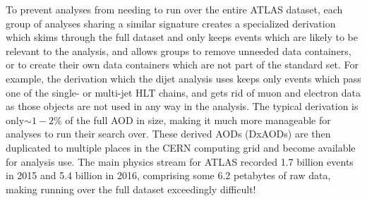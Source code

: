 To prevent analyses from needing to run over the entire ATLAS dataset, each group of analyses sharing a similar signature creates a specialized derivation which skims through the full dataset and only keeps events which are likely to be relevant to the analysis, and allows groups to remove unneeded data containers, or to create their own data containers which are not part of the standard set.  For example, the derivation which the dijet analysis uses keeps only events which pass one of the single- or multi-jet HLT chains, and gets rid of muon and electron data as those objects are not used in any way in the analysis.  The typical derivation is only$\sim1-2\%$ of the full AOD in size, making it much more manageable for analyses to run their search over.  These derived AODs (DxAODs) are then duplicated to multiple places in the CERN computing grid and become available for analysis use.  The main physics stream for ATLAS recorded 1.7 billion events in 2015 and 5.4 billion in 2016, comprising some 6.2 petabytes of raw data, making running over the full dataset exceedingly difficult!